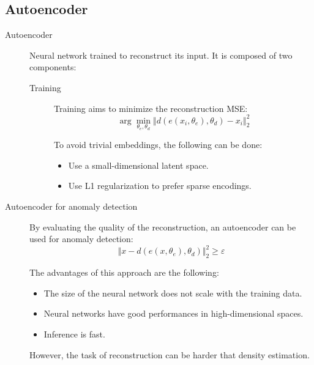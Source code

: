 \subsection{Autoencoder}

\begin{description}
    \item[Autoencoder] 
        Neural network trained to reconstruct its input. It is composed of two components:

        \begin{description}
            \item[Training]
                Training aims to minimize the reconstruction MSE:
                \[ \arg\min_{\theta_e, \theta_d} \left\Vert d\left( e(x_i, \theta_e), \theta_d \right) - x_i \right\Vert_2^2 \]

                To avoid trivial embeddings, the following can be done:
                \begin{itemize}
                    \item Use a small-dimensional latent space.
                    \item Use L1 regularization to prefer sparse encodings.
                \end{itemize}
        \end{description}


    \item[Autoencoder for anomaly detection]
        By evaluating the quality of the reconstruction, an autoencoder can be used for anomaly detection:
        \[ \Vert x - d(e(x, \theta_e), \theta_d) \Vert_2^2 \geq \varepsilon \]

        The advantages of this approach are the following:
        \begin{itemize}
            \item The size of the neural network does not scale with the training data.
            \item Neural networks have good performances in high-dimensional spaces.
            \item Inference is fast.
        \end{itemize}

        However, the task of reconstruction can be harder that density estimation.
\end{description}

